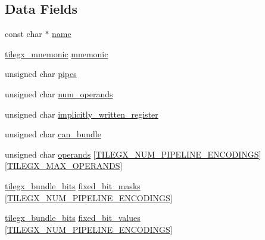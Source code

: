 \subsection*{Data Fields}
\begin{DoxyCompactItemize}
\item 
const char $\ast$ \hyperlink{structtilegx__opcode_a3c82f02ce7888483afa4d5d101f0c220}{name}
\item 
\hyperlink{sljitNativeTILEGX-encoder_8c_a468f91dc4ffc5ee03ff7a50e9ee96ffc}{tilegx\+\_\+mnemonic} \hyperlink{structtilegx__opcode_a5c6605c6327f193d3eb1bc2d58d2cbfd}{mnemonic}
\item 
unsigned char \hyperlink{structtilegx__opcode_a80b053aec738c5062d6e7cff90cbaf11}{pipes}
\item 
unsigned char \hyperlink{structtilegx__opcode_a2b6e28a77cfbe70c378e4ad91ff695cd}{num\+\_\+operands}
\item 
unsigned char \hyperlink{structtilegx__opcode_a5267f00695fd0ecd271e2e0a069b171a}{implicitly\+\_\+written\+\_\+register}
\item 
unsigned char \hyperlink{structtilegx__opcode_a3719664c51044e303eea49ae99021502}{can\+\_\+bundle}
\item 
unsigned char \hyperlink{structtilegx__opcode_ad6ab82aa4bbc6df07d4ce9372b61504b}{operands} \mbox{[}\hyperlink{sljitNativeTILEGX-encoder_8c_a56a0f36da7f9eaaf54bd05cc2bf49173a7cea977ea384b8a16e500e5b8c5392e4}{T\+I\+L\+E\+G\+X\+\_\+\+N\+U\+M\+\_\+\+P\+I\+P\+E\+L\+I\+N\+E\+\_\+\+E\+N\+C\+O\+D\+I\+N\+GS}\mbox{]}\mbox{[}\hyperlink{sljitNativeTILEGX-encoder_8c_aa156d1cebb38c8a65846c4d9c006012aa23db5f91514048ae08bc5e8c18230fc2}{T\+I\+L\+E\+G\+X\+\_\+\+M\+A\+X\+\_\+\+O\+P\+E\+R\+A\+N\+DS}\mbox{]}
\item 
\hyperlink{sljitNativeTILEGX-encoder_8c_abbcf9d5abf989cd724d5ac2efdd9b6f1}{tilegx\+\_\+bundle\+\_\+bits} \hyperlink{structtilegx__opcode_a37a8c0f4d45656759a9a7b278d4cde78}{fixed\+\_\+bit\+\_\+masks} \mbox{[}\hyperlink{sljitNativeTILEGX-encoder_8c_a56a0f36da7f9eaaf54bd05cc2bf49173a7cea977ea384b8a16e500e5b8c5392e4}{T\+I\+L\+E\+G\+X\+\_\+\+N\+U\+M\+\_\+\+P\+I\+P\+E\+L\+I\+N\+E\+\_\+\+E\+N\+C\+O\+D\+I\+N\+GS}\mbox{]}
\item 
\hyperlink{sljitNativeTILEGX-encoder_8c_abbcf9d5abf989cd724d5ac2efdd9b6f1}{tilegx\+\_\+bundle\+\_\+bits} \hyperlink{structtilegx__opcode_a84facac7722baf151d404ac28f69a3a0}{fixed\+\_\+bit\+\_\+values} \mbox{[}\hyperlink{sljitNativeTILEGX-encoder_8c_a56a0f36da7f9eaaf54bd05cc2bf49173a7cea977ea384b8a16e500e5b8c5392e4}{T\+I\+L\+E\+G\+X\+\_\+\+N\+U\+M\+\_\+\+P\+I\+P\+E\+L\+I\+N\+E\+\_\+\+E\+N\+C\+O\+D\+I\+N\+GS}\mbox{]}
\end{DoxyCompactItemize}


